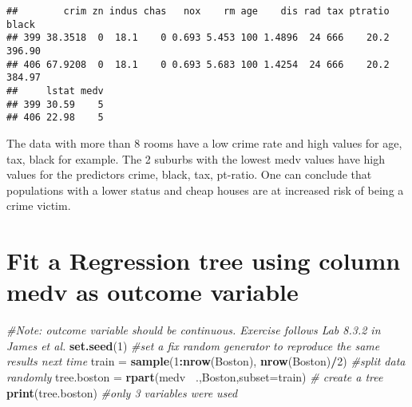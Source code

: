 \documentclass[]{article}
\newenvironment{Shaded}{\begin{snugshade}}{\end{snugshade}}
\newcommand{\CommentTok}[1]{\textcolor[rgb]{0.56,0.35,0.01}{\textit{#1}}}
\newcommand{\DataTypeTok}[1]{\textcolor[rgb]{0.13,0.29,0.53}{#1}}
\newcommand{\DecValTok}[1]{\textcolor[rgb]{0.00,0.00,0.81}{#1}}
\newcommand{\KeywordTok}[1]{\textcolor[rgb]{0.13,0.29,0.53}{\textbf{#1}}}
\newcommand{\NormalTok}[1]{#1}
\newcommand{\OperatorTok}[1]{\textcolor[rgb]{0.81,0.36,0.00}{\textbf{#1}}}
\newcommand{\StringTok}[1]{\textcolor[rgb]{0.31,0.60,0.02}{#1}}
\begin{document}
\begin{Shaded}
\end{Shaded}

\begin{verbatim}
##        crim zn indus chas   nox    rm age    dis rad tax ptratio  black
## 399 38.3518  0  18.1    0 0.693 5.453 100 1.4896  24 666    20.2 396.90
## 406 67.9208  0  18.1    0 0.693 5.683 100 1.4254  24 666    20.2 384.97
##     lstat medv
## 399 30.59    5
## 406 22.98    5
\end{verbatim}

The data with more than 8 rooms have a low crime rate and high values
for age, tax, black for example. The 2 suburbs with the lowest medv
values have high values for the predictors crime, black, tax, pt-ratio.
One can conclude that populations with a lower status and cheap houses
are at increased risk of being a crime victim.

\hypertarget{fit-a-regression-tree-using-column-medv-as-outcome-variable}{%
\section{Fit a Regression tree using column medv as outcome
variable}\label{fit-a-regression-tree-using-column-medv-as-outcome-variable}}

\begin{Shaded}
\begin{Highlighting}[]
\CommentTok{#Note: outcome variable should be continuous. Exercise follows Lab 8.3.2 in James et al.}
\KeywordTok{set.seed}\NormalTok{(}\DecValTok{1}\NormalTok{) }\CommentTok{#set a fix random generator to reproduce the same results next time}
\NormalTok{train =}\StringTok{ }\KeywordTok{sample}\NormalTok{(}\DecValTok{1}\OperatorTok{:}\KeywordTok{nrow}\NormalTok{(Boston), }\KeywordTok{nrow}\NormalTok{(Boston)}\OperatorTok{/}\DecValTok{2}\NormalTok{)   }\CommentTok{#split data randomly}
\NormalTok{tree.boston =}\StringTok{ }\KeywordTok{rpart}\NormalTok{(medv }\OperatorTok{~}\NormalTok{.,Boston,}\DataTypeTok{subset=}\NormalTok{train) }\CommentTok{# create a tree}
\KeywordTok{print}\NormalTok{(tree.boston) }\CommentTok{#only 3 variables were used}
\end{Highlighting}
\end{Shaded}
\end{document}
